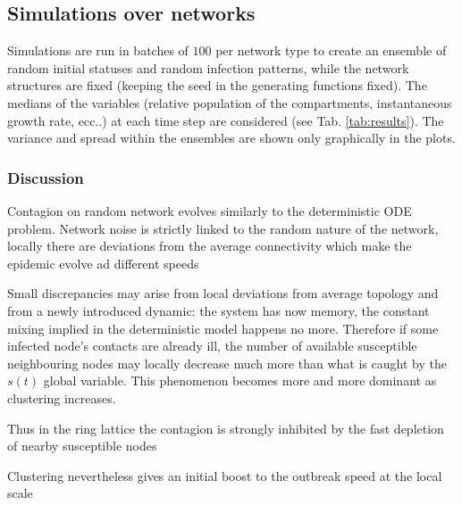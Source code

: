 \documentclass[DIV=12, BCOR=0pt]{scrartcl}  %
\begin{document}
  
  \subsection{Simulations over networks}
	Simulations are run in batches of $100$ per network type to create an ensemble of random initial statuses and random infection patterns, while the network structures are fixed (keeping the seed in the generating functions fixed). The medians of the variables (relative population of the compartments, instantaneous growth rate, ecc..) at each time step are considered (see Tab. \ref{tab:results}). The variance and spread within the ensembles are shown only graphically in the plots.
  
  
  
  
  \subsubsection{Discussion}
  Contagion on random network evolves similarly to the deterministic ODE problem. 
  Network noise is strictly linked to the random nature of the network, locally there are deviations from the average connectivity which make the epidemic evolve ad different speeds
  
  Small discrepancies may arise from local deviations from average topology and from a newly introduced dynamic: the system has now memory, the constant mixing implied in the deterministic model happens no more. Therefore if some infected node's contacts are already ill, the number of available susceptible neighbouring nodes may locally decrease much more than what is caught by the $s(t)$ global variable. This phenomenon becomes more and more dominant as clustering increases.
  
  Thus in the ring lattice the contagion is strongly inhibited 
  by the fast depletion of nearby susceptible nodes %
  
  Clustering nevertheless gives an initial boost to the outbreak speed at the local scale
   
  
\end{document}
